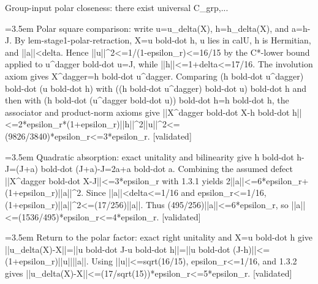 \documentclass{article}
\newcommand{\step}[1]{\par\noindent\hangindent=3.5em\hangafter=1%
  \makebox[3.5em][l]{\textbf{#1.}}}
\newcommand{\steptag}[1]{\hfill{\small\textsf{[#1]}}}
\begin{document}
\begin{proofbox}{Group-input polar closeness: there exist universal C\_grp,...}
\step{1.3.1} Polar square comparison: write u=u\_delta(X), h=h\_delta(X), and a=h-J. By lem-stage1-polar-retraction, X=u bold-dot h, u lies in calU, h is Hermitian, and ||a||<delta. Hence ||u||\textasciicircum{}2<=1/(1-epsilon\_r)<=16/15 by the C*-lower bound applied to u\textasciicircum{}dagger bold-dot u=J, while ||h||<=1+delta<=17/16. The involution axiom gives X\textasciicircum{}dagger=h bold-dot u\textasciicircum{}dagger. Comparing (h bold-dot u\textasciicircum{}dagger) bold-dot (u bold-dot h) with ((h bold-dot u\textasciicircum{}dagger) bold-dot u) bold-dot h and then with (h bold-dot (u\textasciicircum{}dagger bold-dot u)) bold-dot h=h bold-dot h, the associator and product-norm axioms give ||X\textasciicircum{}dagger bold-dot X-h bold-dot h||<=2*epsilon\_r*(1+epsilon\_r)||h||\textasciicircum{}2||u||\textasciicircum{}2<=(9826/3840)*epsilon\_r<=3*epsilon\_r. \steptag{validated} \\[4pt]
\step{1.3.2} Quadratic absorption: exact unitality and bilinearity give h bold-dot h-J=(J+a) bold-dot (J+a)-J=2a+a bold-dot a. Combining the assumed defect ||X\textasciicircum{}dagger bold-dot X-J||<=3*epsilon\_r with 1.3.1 yields 2||a||<=6*epsilon\_r+(1+epsilon\_r)||a||\textasciicircum{}2. Since ||a||<delta<=1/16 and epsilon\_r<=1/16, (1+epsilon\_r)||a||\textasciicircum{}2<=(17/256)||a||. Thus (495/256)||a||<=6*epsilon\_r, so ||a||<=(1536/495)*epsilon\_r<=4*epsilon\_r. \steptag{validated} \\[4pt]
\step{1.3.3} Return to the polar factor: exact right unitality and X=u bold-dot h give ||u\_delta(X)-X||=||u bold-dot J-u bold-dot h||=||u bold-dot (J-h)||<=(1+epsilon\_r)||u||||a||. Using ||u||<=sqrt(16/15), epsilon\_r<=1/16, and 1.3.2 gives ||u\_delta(X)-X||<=(17/sqrt(15))*epsilon\_r<=5*epsilon\_r. \steptag{validated} \\[4pt]
\end{proofbox}
\end{document}
